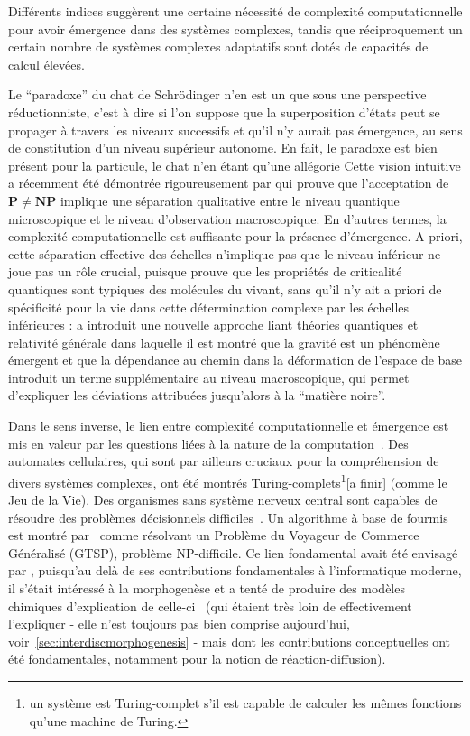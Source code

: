 Différents indices suggèrent une certaine nécessité de complexité computationnelle pour avoir émergence dans des systèmes complexes, tandis que réciproquement un certain nombre de systèmes complexes adaptatifs sont dotés de capacités de calcul élevées. 

Le ``paradoxe'' du chat de Schrödinger n'en est un que sous une perspective réductionniste, c'est à dire si l'on suppose que la superposition d'états peut se propager à travers les niveaux successifs et qu'il n'y aurait pas émergence, au sens de constitution d'un niveau supérieur autonome. En fait, le paradoxe est bien présent pour la particule, le chat n'en étant qu'une allégorie Cette vision intuitive a récemment été démontrée rigoureusement par \cite{2014arXiv1403.7686B} qui prouve que l'acceptation de $\mathbf{P}\neq\mathbf{NP}$ implique une séparation qualitative entre le niveau quantique microscopique et le niveau d'observation macroscopique. En d'autres termes, la complexité computationnelle est suffisante pour la présence d'émergence. A priori, cette séparation effective des échelles n'implique pas que le niveau inférieur ne joue pas un rôle crucial, puisque \cite{vattay2015quantum} prouve que les propriétés de criticalité quantiques sont typiques des molécules du vivant, sans qu'il n'y ait a priori de spécificité pour la vie dans cette détermination complexe par les échelles inférieures : \cite{2016arXiv161102269V} a introduit une nouvelle approche liant théories quantiques et relativité générale dans laquelle il est montré que la gravité est un phénomène émergent et que la dépendance au chemin dans la déformation de l'espace de base introduit un terme supplémentaire au niveau macroscopique, qui permet d'expliquer les déviations attribuées jusqu'alors à la ``matière noire''.

Dans le sens inverse, le lien entre complexité computationnelle et émergence est mis en valeur par les questions liées à la nature de la computation~\cite{moore2011nature}. Des automates cellulaires, qui sont par ailleurs cruciaux pour la compréhension de divers systèmes complexes, ont été montrés Turing-complets\footnote{un système est Turing-complet s'il est capable de calculer les mêmes fonctions qu'une machine de Turing. }[a finir] (comme le Jeu de la Vie). Des organismes sans système nerveux central sont capables de résoudre des problèmes décisionnels difficiles~\cite{reid2016decision}. Un algorithme à base de fourmis est montré par~\cite{Pintea2017} comme résolvant un Problème du Voyageur de Commerce Généralisé (GTSP), problème NP-difficile. Ce lien fondamental avait été envisagé par , puisqu'au delà de ses contributions fondamentales à l'informatique moderne, il s'était intéressé à la morphogenèse et a tenté de produire des modèles chimiques d'explication de celle-ci~\cite{turing1952chemical} (qui étaient très loin de effectivement l'expliquer - elle n'est toujours pas bien comprise aujourd'hui, voir~\ref{sec:interdiscmorphogenesis} - mais dont les contributions conceptuelles ont été fondamentales, notamment pour la notion de réaction-diffusion).


